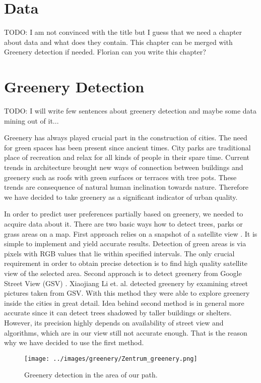 \documentclass[letterpaper]{article}
\begin{document}
\section{Data}
TODO: I am not convinced with the title but I guess that we need a chapter about data and what does they contain.
This chapter can be merged with Greenery detection if needed.
Florian can you write this chapter?

\section{Greenery Detection}\label{sec:greenery}
TODO: I will write few sentences about greenery detection and maybe some data mining out of it...

\indent Greenery has always played crucial part in the construction of cities. The need for green spaces has been present since ancient times. 
City parks are traditional place of recreation and relax for all kinds of people in their spare time. Current trends in architecture brought new ways of
connection between buildings and greenery such as roofs with green surfaces or terraces with tree pots. These trends are consequence of natural human inclination towards nature. Therefore we have decided to take greenery as a significant indicator of urban quality. 

\indent In order to predict user preferences partially based on greenery, we needed to acquire data about it. There are two basic ways how to detect trees, parks or grass areas on a map. First approach relies on a snapshot of a satellite view \cite{smartCities}. It is simple to implement and yield accurate results. Detection of green areas is via pixels with RGB values that lie within specified intervals. The only crucial requirement in order to obtain precise detection is to find high quality satellite view of the selected area.
Second approach is to detect greenery from Google Street View (GSV) \cite{googleView}. Xiaojiang Li et. al. detected greenery by examining street
pictures taken from GSV. With this method they were able to explore greenery inside the cities in great detail. Idea behind second method is in general
more accurate since it can detect trees shadowed by taller buildings or shelters. However, its precision highly depends on availability of street view and
algorithms, which are in our view still not accurate enough. That is the reason why we have decided to use the first method.
 
  \begin{figure}
 	\centering
 	\texttt{[image: ../images/greenery/Zentrum\_greenery.png]}
 	\caption{Greenery detection in the area of our path.}
 	\label{fig:path_greenery}
 \end{figure}
\end{document}
